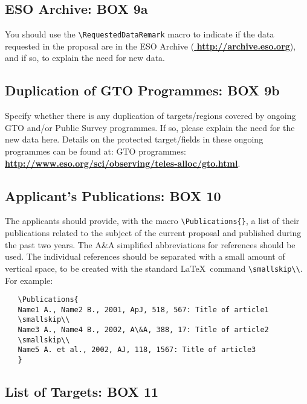 \documentclass{article}
\begin{document}
\subsection{ESO Archive: {\bf BOX 9a}}
You should use the \verb|\RequestedDataRemark| macro to indicate if
the data requested in the proposal are in the ESO Archive
(\href{http://archive.eso.org}{\bf
  \underline{http://archive.eso.org}}), and if so, to explain the
need for new data.

\subsection{Duplication of GTO Programmes: {\bf BOX 9b}}

Specify whether there is any duplication of targets/regions covered by ongoing GTO and/or Public Survey
programmes. If so, please explain the need for the new data here. Details on the protected target/fields in these
ongoing programmes can be found at:
GTO programmes: \\
\href{http://www.eso.org/sci/observing/teles-alloc/gto.html}
{\bf  \underline{http://www.eso.org/sci/observing/teles-alloc/gto.html}}.

\subsection{Applicant's  Publications: {\bf BOX 10}}

The applicants should provide, with the macro
\verb|\Publications{}|, a list of their publications related to the
subject of the current proposal and published during the past two
years. The A\&A simplified abbreviations for references should be
used. The individual references should be separated with a small
amount of vertical space, to be created with the standard \LaTeX\
command \verb|\smallskip\\|. For example:
\begin{verbatim}
   \Publications{
   Name1 A., Name2 B., 2001, ApJ, 518, 567: Title of article1
   \smallskip\\
   Name3 A., Name4 B., 2002, A\&A, 388, 17: Title of article2
   \smallskip\\
   Name5 A. et al., 2002, AJ, 118, 1567: Title of article3
   }
\end{verbatim}

\subsection{List of Targets: {\bf BOX 11}}
  
\end{document}
